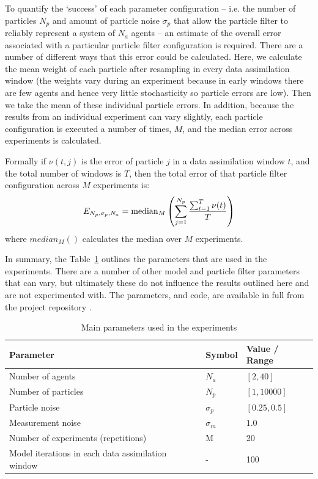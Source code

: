 To quantify the `success' of each parameter configuration -- i.e. the number of particles $N_p$ and amount of particle noise $\sigma_p$ that allow the particle filter to reliably represent a system of $N_a$ agents -- an estimate of the overall error associated with a particular particle filter configuration is required. There are a number of different ways that this error could be calculated. Here, we calculate the mean weight of each particle after resampling in every data assimilation window (the weights vary during an experiment because in early windows there are few agents and hence very little stochasticity so particle errors are low). Then we take the mean of these individual particle errors. In addition, because the results from an individual experiment can vary slightly, each particle configuration is executed a number of times, $M$, and the median error across experiments is calculated.

Formally if $\nu(t,j)$ is the error of particle $j$ in a data assimilation window $t$, and the total number of windows is $T$, then the total error of that particle filter configuration across $M$  experiments is: 
\begin{equation}
  E_{N_p,\sigma_p,N_a} =  {\rm median}_M \left( \sum_{j=1}^{N_p}  \frac{\sum_{t=1}^{T}\nu(t)}{T} \right)
\end{equation}
where $median_M()$ calculates the median over $M$ experiments.

In summary, the Table~\ref{tab:experiment_parameters} outlines the parameters that are used in the experiments. There are a number of other model and particle filter parameters that can vary, but ultimately these do not influence the results outlined here and are not experimented with. The parameters, and code, are available in full from the project repository \cite{stationsimgit}. 

\begin{table}[ht] \caption{Main parameters used in the experiments}
	\begin{center}
		\begin{tabular}{l l l } 
		    \hline Parameter & Symbol & Value / Range \\
			\hline
			Number of agents & $N_a$ & $[ 2, 40 ]$ \\
			Number of particles & $N_p$ & $[ 1, 10000 ]$ \\
			Particle noise & $\sigma_p $ & $[0.25, 0.5]$ \\
			Measurement noise & $\sigma_m$ &  $1.0$ \\
			Number of experiments (repetitions) & M & 20 \\
			Model iterations in each data assimilation window & - & 100 \\ 
			\hline
	\end{tabular} \end{center} \label{tab:experiment_parameters}
\end{table}%



